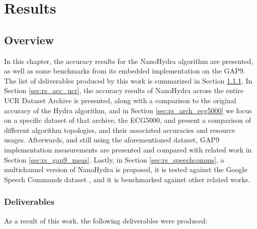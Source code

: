 \chapter{Results}
\label{ch:results}

\section{Overview}

In this chapter, the accuracy results for the NanoHydra algorithm are presented, as well as some benchmarks from its embedded implementation on the GAP9.
The list of deliverables produced by this work is summarized in Section \ref{sec:rs_deliv}. In Section \ref{sec:rs_acc_ucr}, the accuracy results of NanoHydra
across the entire UCR Dataset Archive is presented, along with a comparison to the original accuracy of the Hydra algorithm, and in Section \ref{sec:rs_arch_ecg5000}
we focus on a specific dataset of that archive, the ECG5000, and present a comparison of different algorithm topologies, and their associated accuracies and 
resource usages. Afterwards, and still using the aforementioned dataset, GAP9 implementation measurements are presented and compared with related work in Section \ref{sec:rs_gap9_meas}. 
Lastly, in Section \ref{sec:rs_speechcomms}, a multichannel version of NanoHydra is proposed, it is tested against the Google Speech Commands dataset \cite{Warden2018}, and it is
benchmarked against other related works.

\subsection{Deliverables}\label{sec:rs_deliv}
As a result of this work, the following deliverables were produced:

